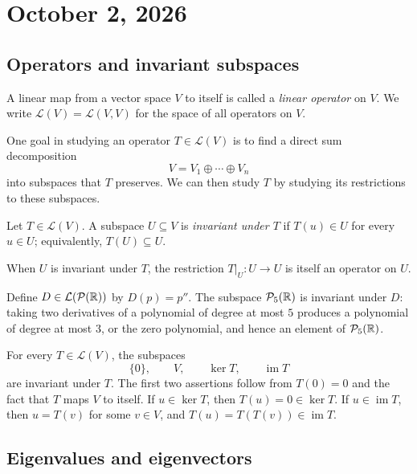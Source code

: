 \section{October 2, 2026}

\subsection{Operators and invariant subspaces}

\begin{definition}
  A linear map from a vector space $V$ to itself is called a
  \emph{linear operator} on $V$. We write
  $\mathcal L(V)=\mathcal L(V,V)$ for the space of all operators
  on $V$.
\end{definition}

One goal in studying an operator $T\in\mathcal L(V)$ is to find
a direct sum decomposition
\[
  V=V_1\oplus\cdots\oplus V_n
\]
into subspaces that $T$ preserves. We can then study $T$ by
studying its restrictions to these subspaces.

\begin{definition}
  Let $T\in\mathcal L(V)$. A subspace $U\subseteq V$ is
  \emph{invariant under $T$} if $T(u)\in U$ for every $u\in U$;
  equivalently, $T(U)\subseteq U$.
\end{definition}

When $U$ is invariant under $T$, the restriction
$T|_U\colon U\to U$ is itself an operator on $U$.

\begin{example}
  Define $D\in\mathcal L(\mathcal P(\mathbb{R}))$ by $D(p)=p''$.
  The subspace $\mathcal P_5(\mathbb{R})$ is invariant under $D$:
  taking two derivatives of a polynomial of degree at most $5$
  produces a polynomial of degree at most $3$, or the zero
  polynomial, and hence an element of $\mathcal P_5(\mathbb{R})$.
\end{example}

\begin{example}
  For every $T\in\mathcal L(V)$, the subspaces
  \[
    \{0\},\qquad V,\qquad \ker T,\qquad \operatorname{im}T
  \]
  are invariant under $T$. The first two assertions follow from
  $T(0)=0$ and the fact that $T$ maps $V$ to itself. If
  $u\in\ker T$, then $T(u)=0\in\ker T$. If
  $u\in\operatorname{im}T$, then $u=T(v)$ for some $v\in V$,
  and $T(u)=T(T(v))\in\operatorname{im}T$.
\end{example}

\subsection{Eigenvalues and eigenvectors}


